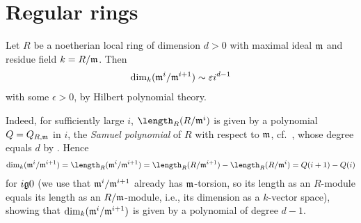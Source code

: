 \documentclass[a4paper,parskip=half,numbers=enddot, DIV=12]{scrreprt}
\begin{document}
\section{Regular rings}
Let $R$ be a noetherian local ring of dimension $d>0$ with maximal ideal $\mathfrak{m}$ and residue field $k=R/\mathfrak{m}$. Then
\begin{align*}
	\dim_k(\mathfrak{m}^i/\mathfrak{m}^{i+1})\sim \varepsilon i^{d-1}
\end{align*}
with some $\epsilon>0$, by Hilbert polynomial theory.

Indeed, for sufficiently large $i$, $\length_R(R/\mm^i)$ is given by a polynomial $Q=Q_{R,\mathfrak{m}}$ in $i$, the \emph{Samuel polynomial} of $R$ with respect to $\mathfrak{m}$, cf.\ \cite[Definition~3.4.3]{alg2}, whose degree equals $d$ by \cite[Theorem~20]{alg2}. Hence
\begin{align*}
	\dim_k(\mm^i/\mm^{i+1})=\length_R(\mm^i/\mm^{i+1})=\length_R(R/\mm^{i+1})-\length_R(R/\mm^i)=Q(i+1)-Q(i)
\end{align*}
for $i\gge 0$ (we use that $\mathfrak{m}^i/\mathfrak{m}^{i+1}$ already has $\mathfrak{m}$-torsion, so its length as an $R$-module equals its length as an $R/\mathfrak{m}$-module, i.e., its dimension as a $k$-vector space), showing that $\dim_k(\mathfrak{m}^i/\mathfrak{m}^{i+1})$ is given by a polynomial of degree $d-1$.
\end{document}
